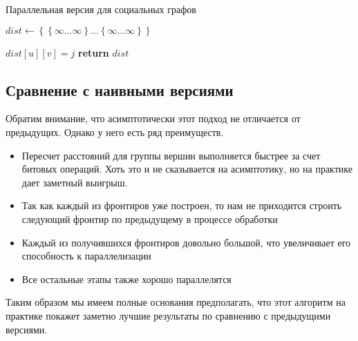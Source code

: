 \FloatBarrier
\begin{algorithm}
\caption{Параллельная версия для социальных графов}\label{all_pairs_social}
\begin{algorithmic}[1]

\State $dist\gets \left\{ {   \left\{ {\infty ... \infty}\right\}  ... \left\{ {\infty ... \infty}\right\} }\right\}$

\State
\algrenewcommand{}
\algrenewcommand{}
		\algrenewcommand{}	
				\State $dist[u][v] = j$		
			\EndIf	
		\EndFor
		\algrenewcommand{}
	\EndFor
\EndFor 
\State \textbf{return} $dist$ 
\EndProcedure

\end{algorithmic}
\end{algorithm}


\FloatBarrier
\subsection{Сравнение с наивными версиями}

Обратим внимание, что асимптотически этот подход не отличается от предыдущих. Однако у него есть ряд преимуществ. 

\begin{itemize}
  \item Пересчет расстояний для группы вершин выполняется быстрее за счет битовых операций. Хоть это и не сказывается на асимптотику, но на практике дает заметный выигрыш. 
  \item Так как каждый из фронтиров уже построен, то нам не приходится строить следующий фронтир по предыдущему в процессе обработки
  \item Каждый из получившихся фронтиров довольно большой, что увеличивает его способность к параллелизации
  \item Все остальные этапы также хорошо параллелятся
\end{itemize}

Таким образом мы имеем полные основания предполагать, что этот алгоритм на практике покажет заметно лучшие результаты по сравнению с предыдущими версиями. 


